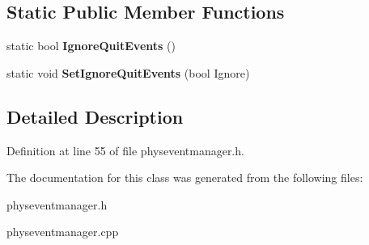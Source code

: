 \subsection*{Static Public Member Functions}
\begin{DoxyCompactItemize}
\item 
\hypertarget{classPhysEventManager_a9783a16342acd71c9a11ade41a2e226b}{
static bool {\bfseries IgnoreQuitEvents} ()}
\label{d5/dd7/classPhysEventManager_a9783a16342acd71c9a11ade41a2e226b}

\item 
\hypertarget{classPhysEventManager_acc902586015a3cd903d14cb20cd51386}{
static void {\bfseries SetIgnoreQuitEvents} (bool Ignore)}
\label{d5/dd7/classPhysEventManager_acc902586015a3cd903d14cb20cd51386}

\end{DoxyCompactItemize}


\subsection{Detailed Description}


Definition at line 55 of file physeventmanager.h.

The documentation for this class was generated from the following files:\begin{DoxyCompactItemize}
\item 
physeventmanager.h\item 
physeventmanager.cpp\end{DoxyCompactItemize}

